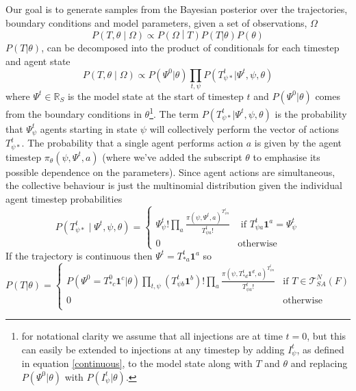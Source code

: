\documentclass{article}
\begin{document}
Our goal is to generate samples from the Bayesian posterior over the trajectories, boundary conditions and model parameters, given a set of observations, $\Omega$
\[
P\left(T,\theta \middle| \Omega\right) \propto P\left(\Omega \middle| T\right)P(T|\theta)P(\theta)
\]
$P(T|\theta)$, can be decomposed into the product of conditionals for each timestep and agent state
\[
P\left(T,\theta \middle| \Omega\right) \propto  P(\Psi^0|\theta) \prod_{t,\psi} P(T^t_{\psi *} | \Psi^t,\psi,\theta)
\]
where $\Psi^t\in\mathbb{R}_S$ is the model state at the start of timestep $t$ and $P(\Psi^0|\theta)$ comes from the boundary conditions in $\theta$\footnote{for notational clarity we assume that all injections are at time $t=0$, but this can easily be extended to injections at any timestep by adding $I^t_\psi$, as defined in equation \eqref{continuous}, to the model state along with $T$ and $\theta$ and replacing $P(\Psi^0|\theta)$ with $P(I^t_\psi|\theta)$.}.  The term $P(T^t_{\psi *} | \Psi^t,\psi,\theta)$ is the probability that $\Psi^t_\psi$ agents starting in state $\psi$ will collectively perform the vector of actions $T^t_{\psi *}$. The probability that a single agent performs action $a$ is given by the agent timestep $\pi_\theta(\psi,\Psi^t,a)$ (where we've added the subscript $\theta$ to emphasise its possible dependence on the parameters). Since agent actions are simultaneous, the collective behaviour is just the multinomial distribution given the individual agent timestep probabilities
\begin{equation}
P\left(T^t_{\psi *} \mid \Psi^t, \psi, \theta\right) = 
\begin{cases}
\Psi^t_\psi!\prod_a \frac{\pi(\psi,\Psi^t,a)^{T^t_{\psi a}}}{T^t_{\psi a}!} & \text{ if } T^t_{\psi a}\mathbf{1}^a = \Psi^t_\psi \\
0 & \text{otherwise}
\end{cases}
\end{equation}
If the trajectory is continuous then $\Psi^t = T^t_{* a}\mathbf{1}^a$ so 
\begin{equation}
P(T|\theta) =
\begin{cases}
P(\Psi^0 = T^0_{* c}\mathbf{1}^c|\theta)
\prod_{t, \psi} \left(T^t_{\psi b} \mathbf{1}^b \right)!
\prod_{a} \frac{\pi(\psi, T^{t}_{* d}\mathbf{1}^d,a)^{T^{t}_{\psi a}}}{T^{t}_{\psi a}!} & \text{if } T \in \mathcal{T}^N_{SA}(F) \\
0 & \text{otherwise}\\
\end{cases}
\label{priorTrajectory}
\end{equation}
\end{document}
